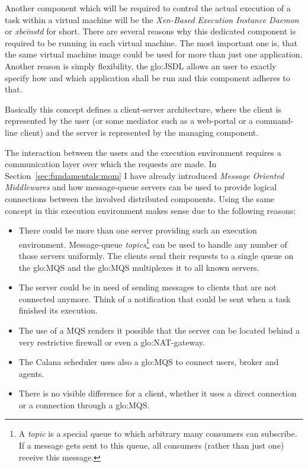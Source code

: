 Another component which  will be required to control  the actual execution
of a task  within a virtual machine will  be the \emph{Xen-Based Execution
  Instance Daemon} or \emph{xbeinstd} for short. There are several reasons
why this  dedicated component  is required to  be running in  each virtual
machine. The  most important one is,  that the same  virtual machine image
could  be used  for more  than just  one application.   Another  reason is
simply flexibility,  the \gls{glo:JSDL} allows an user  to exactly specify
how and which application shall be run and this component adheres to that.

Basically  this concept  defines a  client-server architecture,  where the
client is represented  by the user (or some mediator  such as a web-portal
or a  command-line client) and the  server is represented  by the managing
component.

The interaction between the users and the execution environment requires a
communication   layer   over   which    the   requests   are   made.    In
Section~\ref{sec:fundamentals:mom} I have already introduced \emph{Message
  Oriented  Middlewares} and  how  message-queue servers  can  be used  to
provide logical  connections between the  involved distributed components.
Using the  same concept in this  execution environment makes  sense due to
the following reasons:

\begin{itemize}
\item  There could be  more than  one server  providing such  an execution
  environment.   Message-queue \emph{topics}\footnote{A \emph{topic}  is a
    special queue to  which arbitrary many consumers can  subscribe.  If a
    message gets sent to this  queue, all consumers (rather than just one)
    receive  this message.}  can  be used  to handle  any number  of those
  servers uniformly. The clients send  their requests to a single queue on
  the  \gls{glo:MQS} and  the \gls{glo:MQS}  multiplexes it  to  all known
  servers.
\item The server could be in  need of sending messages to clients that are
  not connected anymore. Think of a notification that could be sent when a
  task finished its execution.
\item The use of a MQS renders  it possible that the server can be located
  behind a very restrictive firewall or even a \gls{glo:NAT}-gateway.
\item The  Calana scheduler  uses also a  \gls{glo:MQS} to  connect users,
  broker and agents.
\item  There is  no visible  difference for  a client,  whether it  uses a
  direct connection or a connection through a \gls{glo:MQS}.
\end{itemize}

